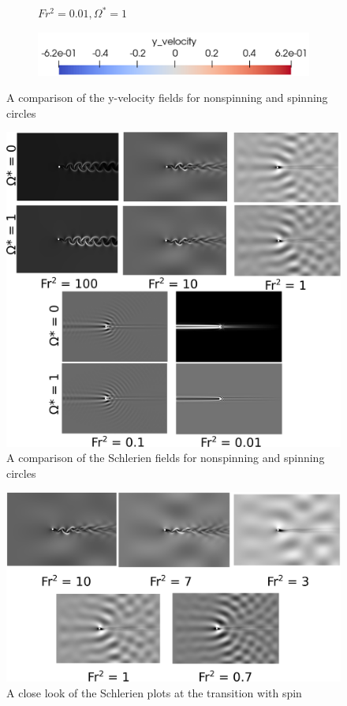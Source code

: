 \begin{figure}
\begin{subfigure}[b]{0.32\textwidth}
        \caption{$Fr^2 = 0.01, \Omega^{\ast} = 1$}
        \label{fig:av1frs0p01}
    \end{subfigure}
    
    \begin{subfigure}[b]{0.32\textwidth}
        \centering
        \includegraphics[width=\textwidth]{images/circle/scale.png}
        \caption*{}
    \end{subfigure}
    
    \caption{A comparison of the y-velocity fields for nonspinning and spinning circles}
    \label{fig:circle y-vel}
\end{figure}

\begin{figure}
    \centering
    \includegraphics[width = \textwidth]{images/circle/circleschlerien.png}
    \caption{A comparison of the Schlerien fields for nonspinning and spinning circles}
    \label{fig:circleschlerien}
\end{figure}

\begin{figure}
    \centering
    \includegraphics[width = \textwidth]{images/circle/circleschlerien2.png}
    \caption{A close look of the Schlerien plots at the transition with spin}
    \label{fig:circleschlerien2}
\end{figure}

